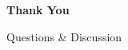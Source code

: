 \documentclass[aspectratio=169]{beamer}
\begin{document}
\begin{frame}{}
    \centering
    \vspace{2cm}
    {\Large \textbf{Thank You}}

    \vspace{1cm}
    Questions \& Discussion
\end{frame}
\end{document}
